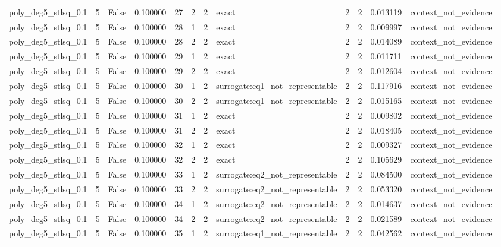 \begin{tabular}{lrrrrrrlrrrl}
poly\_deg5\_stlsq\_0.1 & 5 & False & 0.100000 & 27 & 2 & 2 & exact & 2 & 2 & 0.013119 & context\_not\_evidence \\
poly\_deg5\_stlsq\_0.1 & 5 & False & 0.100000 & 28 & 1 & 2 & exact & 2 & 2 & 0.009997 & context\_not\_evidence \\
poly\_deg5\_stlsq\_0.1 & 5 & False & 0.100000 & 28 & 2 & 2 & exact & 2 & 2 & 0.014089 & context\_not\_evidence \\
poly\_deg5\_stlsq\_0.1 & 5 & False & 0.100000 & 29 & 1 & 2 & exact & 2 & 2 & 0.011711 & context\_not\_evidence \\
poly\_deg5\_stlsq\_0.1 & 5 & False & 0.100000 & 29 & 2 & 2 & exact & 2 & 2 & 0.012604 & context\_not\_evidence \\
poly\_deg5\_stlsq\_0.1 & 5 & False & 0.100000 & 30 & 1 & 2 & surrogate:eq1\_not\_representable & 2 & 2 & 0.117916 & context\_not\_evidence \\
poly\_deg5\_stlsq\_0.1 & 5 & False & 0.100000 & 30 & 2 & 2 & surrogate:eq1\_not\_representable & 2 & 2 & 0.015165 & context\_not\_evidence \\
poly\_deg5\_stlsq\_0.1 & 5 & False & 0.100000 & 31 & 1 & 2 & exact & 2 & 2 & 0.009802 & context\_not\_evidence \\
poly\_deg5\_stlsq\_0.1 & 5 & False & 0.100000 & 31 & 2 & 2 & exact & 2 & 2 & 0.018405 & context\_not\_evidence \\
poly\_deg5\_stlsq\_0.1 & 5 & False & 0.100000 & 32 & 1 & 2 & exact & 2 & 2 & 0.009327 & context\_not\_evidence \\
poly\_deg5\_stlsq\_0.1 & 5 & False & 0.100000 & 32 & 2 & 2 & exact & 2 & 2 & 0.105629 & context\_not\_evidence \\
poly\_deg5\_stlsq\_0.1 & 5 & False & 0.100000 & 33 & 1 & 2 & surrogate:eq2\_not\_representable & 2 & 2 & 0.084500 & context\_not\_evidence \\
poly\_deg5\_stlsq\_0.1 & 5 & False & 0.100000 & 33 & 2 & 2 & surrogate:eq2\_not\_representable & 2 & 2 & 0.053320 & context\_not\_evidence \\
poly\_deg5\_stlsq\_0.1 & 5 & False & 0.100000 & 34 & 1 & 2 & surrogate:eq2\_not\_representable & 2 & 2 & 0.014637 & context\_not\_evidence \\
poly\_deg5\_stlsq\_0.1 & 5 & False & 0.100000 & 34 & 2 & 2 & surrogate:eq2\_not\_representable & 2 & 2 & 0.021589 & context\_not\_evidence \\
poly\_deg5\_stlsq\_0.1 & 5 & False & 0.100000 & 35 & 1 & 2 & surrogate:eq1\_not\_representable & 2 & 2 & 0.042562 & context\_not\_evidence \\

\end{tabular}
